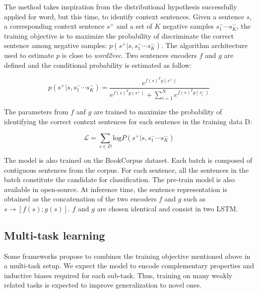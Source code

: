 The method takes inspiration from the distributional hypothesis successfully applied for word, but this time, to identify context sentences. Given a sentence $s$, a corresponding context sentence $s^+$ and a set of $K$ negative samples $s^-_1 \cdots s^-_K$, the training objective is to maximize the probability of discriminate the correct sentence among negative samples: $p(s^+ | s, s^-_1 \cdots s^-_K)$. The algorithm architecture used to estimate $p$ is close to \textsl{word2vec}. Two sentences encoders $f$ and $g$ are defined and the conditional probability is estimated as follow:


\begin{equation*}
    p(s^+ | s, s^-_1 \cdots s^-_K) = \frac{e^{f(s)^Tg(s^+)}}{e^{f(s)^Tg(s^+)}+\sum_{i=1}^Ne^{f(s)^Tg(s^-_i)}}    
\end{equation*}

The parameters from $f$ anf $g$ are trained to maximize the probability of identifying the correct context sentences for
each sentence in the training data D:

\begin{equation*}
    \mathcal{L} = \sum_{s \in D} \text{log} P(s^+ | s, s^-_1 \cdots s^-_K)
\end{equation*}


The model is also trained on the BookCorpus dataset. Each batch is composed of contiguous sentences from the corpus. For each sentence, all the sentences in the batch constitute the candidate for classification. The pre-train model is also available in open-source. At inference time, the sentence representation is obtained as the concatenation of the two encoders $f$ and $g$ such as $s \rightarrow [f(s);g(s)]$. $f$ and $g$ are chosen identical and consist in two LSTM. 


\subsection{Multi-task learning}

Some frameworks propose to combines the training objective mentioned above in a multi-task setup. We expect the model to encode complementary properties and inductive biases required for each sub-task. Thus, training on many weakly related tasks is expected to improve generalization to novel ones.

